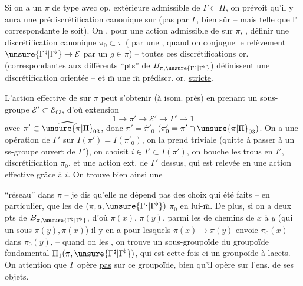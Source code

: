 

Si on a un $\pi$  de type  avec op. extérieure admissible de $\Gamma\subset\Pi$, on prévoit qu'il y aura une prédiscrétification  canonique sur  (pas  par $\Gamma$, bien sûr \unsure{!|)} -- mais telle que l' correspondante le soit). On  , pour une action  admissible de \unsure{$\Gamma^{\natural}$|$\Gamma^{\flat}$} sur $\pi$, , définir une discrétification   canonique $\pi_0\subset\pi$ ( par une , quand on conjugue  le relèvement $\unsure{\Gamma^{\natural}|\Gamma^{\flat}}\to\mathcal E$ par un $g\in\pi$) -- toutes ces discrétifications or. (correspondantes aux différents ``pts'' de $B_{\pi,\unsure{\Gamma^{\natural}|\Gamma^{\flat}}}$) définissent une  discrétification orientée -- et $\overline{\mathrm m}$ une $\overline{\mathrm m}$ prédiscr. or. \uline{stricte}.

L'action effective de \unsure{$\Gamma^{\natural}$|$\Gamma^{\flat}$} sur $\pi$ peut s'obtenir (à isom. près)  en prenant un sous-groupe  $\mathcal E'\subset\mathcal E_{03}$, d'où extension
\[
1\to\pi'\to\mathcal E'\to\Gamma'\to1
\]
avec $\pi'\subset\widehat{\unsure{\pi|\Pi}}_{03}$, donc $\pi'=\widehat{\pi}'_0$ $(\pi'_0=\pi'\cap\unsure{\pi|\Pi}_{03})$. On a une opération de $\Gamma'$ sur $I(\pi')=I(\pi'_0)$, on la prend triviale (quitte à passer à un ss-groupe ouvert de $\Gamma'$), on choisit $i\in I'\subset I(\pi')$, on bouche les trous en $I'$,   discrétification  $\pi_0$, et une action ext. de $\Gamma'$ dessus, qui est relevée en une action effective grâce à $i$. On trouve bien ainsi une



``réseau''  dans $\pi$ -- je dis qu'elle ne dépend pas des choix qui  été faits -- en particulier, que les  de $(\pi,a,\unsure{\Gamma^{\natural}|\Gamma^{\flat}})$  $\pi_0$ en lui-$\overline{\mathrm m}$. De plus, si on a deux pts  de $B_{\pi,\unsure{\Gamma^{\natural}|\Gamma^{\flat}}}$, d'où $\pi(x)$, $\pi(y)$, parmi les  de chemins de $x$ à $y$ (qui  un  sous $\pi(y),\pi(x)$) il y en a pour lesquels  $\pi(x)\to\pi(y)$ envoie $\pi_0(x)$ dans $\pi_0(y)$, -- quand on les , on trouve un sous-groupoïde du groupoïde fondamental $\Pi_1(\pi,\unsure{\Gamma^{\natural}|\Gamma^{\flat}})$, qui est cette fois ci un groupoïde \uline{} à lacets. On  attention que $\Gamma$ opère \uline{pas} sur ce groupoïde, bien qu'il opère sur l'ens. de ses objets.

